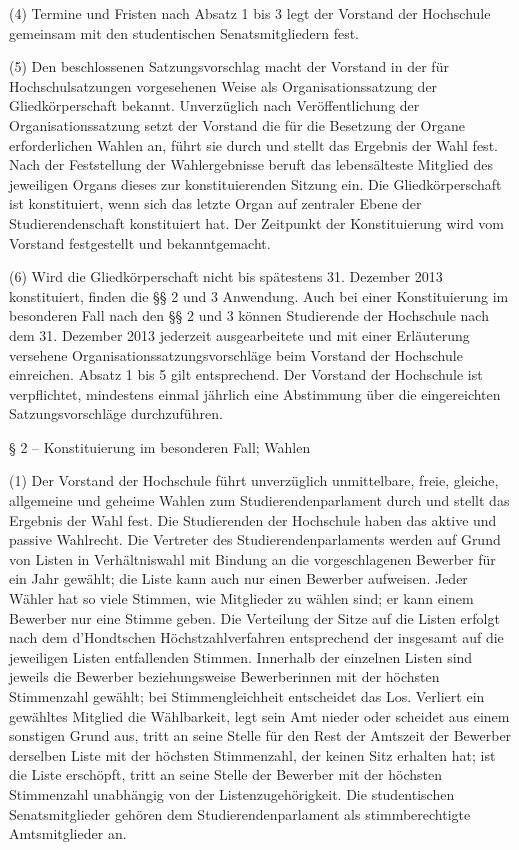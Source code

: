 \documentclass[
10pt,
a4paper,
twoside,								%
titlepage=false,							%
draft=false								%
]{scrartcl}
\begin{document}
(4) Termine und Fristen nach Absatz 1 bis 3 legt der Vorstand der Hochschule gemeinsam mit den studentischen Senatsmitgliedern fest.

(5) Den beschlossenen Satzungsvorschlag macht der Vorstand in der für Hochschulsatzungen vorgesehenen Weise als Organisationssatzung der Gliedkörperschaft bekannt. Unverzüglich nach Veröffentlichung der Organisationssatzung setzt der Vorstand die für die Besetzung der Organe erforderlichen Wahlen an, führt sie durch und stellt das Ergebnis der Wahl fest. Nach der Feststellung der Wahlergebnisse beruft das lebensälteste Mitglied des jeweiligen Organs dieses zur konstituierenden Sitzung ein. Die Gliedkörperschaft ist konstituiert, wenn sich das letzte Organ auf zentraler Ebene der Studierendenschaft konstituiert hat. Der Zeitpunkt der Konstituierung wird vom Vorstand festgestellt und bekanntgemacht.

(6) Wird die Gliedkörperschaft nicht bis spätestens 31. Dezember 2013 konstituiert, finden die §§ 2 und 3 Anwendung. Auch bei einer Konstituierung im besonderen Fall nach den §§ 2 und 3 können Studierende der Hochschule nach dem 31. Dezember 2013 jederzeit ausgearbeitete und mit einer Erläuterung versehene Organisationssatzungsvorschläge beim Vorstand der Hochschule einreichen. Absatz 1 bis 5 gilt entsprechend. Der Vorstand der Hochschule ist verpflichtet, mindestens einmal jährlich eine Abstimmung über die eingereichten Satzungsvorschläge durchzuführen.


§ 2 – Konstituierung im besonderen Fall; Wahlen

(1) Der Vorstand der Hochschule führt unverzüglich unmittelbare, freie, gleiche, allgemeine und geheime Wahlen zum Studierendenparlament durch und stellt das Ergebnis der Wahl fest. Die Studierenden der Hochschule haben das aktive und passive Wahlrecht. Die Vertreter des Studierendenparlaments werden auf Grund von Listen in Verhältniswahl mit Bindung an die vorgeschlagenen Bewerber für ein Jahr gewählt; die Liste kann auch nur einen Bewerber aufweisen. Jeder Wähler hat so viele Stimmen, wie Mitglieder zu wählen sind; er kann einem Bewerber nur eine Stimme geben. Die Verteilung der Sitze auf die Listen erfolgt nach dem d’Hondtschen Höchstzahlverfahren entsprechend der insgesamt auf die jeweiligen Listen entfallenden Stimmen. Innerhalb der einzelnen Listen sind jeweils die Bewerber beziehungsweise Bewerberinnen mit der höchsten Stimmenzahl gewählt; bei Stimmengleichheit entscheidet das Los. Verliert ein gewähltes Mitglied die Wählbarkeit, legt sein Amt nieder oder scheidet aus einem sonstigen Grund aus, tritt an seine Stelle für den Rest der Amtszeit der Bewerber derselben Liste mit der höchsten Stimmenzahl, der keinen Sitz erhalten hat; ist die Liste erschöpft, tritt an seine Stelle der Bewerber mit der höchsten Stimmenzahl unabhängig von der Listenzugehörigkeit. Die studentischen Senatsmitglieder gehören dem Studierendenparlament als stimmberechtigte Amtsmitglieder an.
\end{document}
